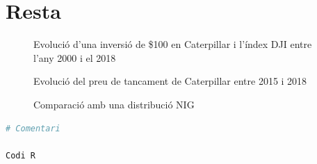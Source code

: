 \documentclass{article}
\numberwithin{table}{section}
\numberwithin{figure}{section}
\numberwithin{equation}{section}
\begin{document}
\section{Resta}

\begin{figure}[htb]
	\centering \sffamily \small
	
	\caption{Evolució d'una inversió de \$100 en Caterpillar i l'índex DJI entre l'any 2000 i el 2018}
	\label{fig:inversio}
\end{figure}

\begin{figure}[htb]
	\centering \sffamily \small
	
	\caption{Evolució del preu de tancament de Caterpillar entre 2015 i 2018}
	\label{fig:distribucio rendibilitats}
\end{figure}
\begin{figure}[htb]
	\centering \sffamily \small
	
	\caption{Comparació amb una distribució NIG}
	\label{fig:comparacio nig}
\end{figure}

\begin{lstlisting}[language=R]
# Comentari

Codi R
\end{lstlisting}



\end{document}
